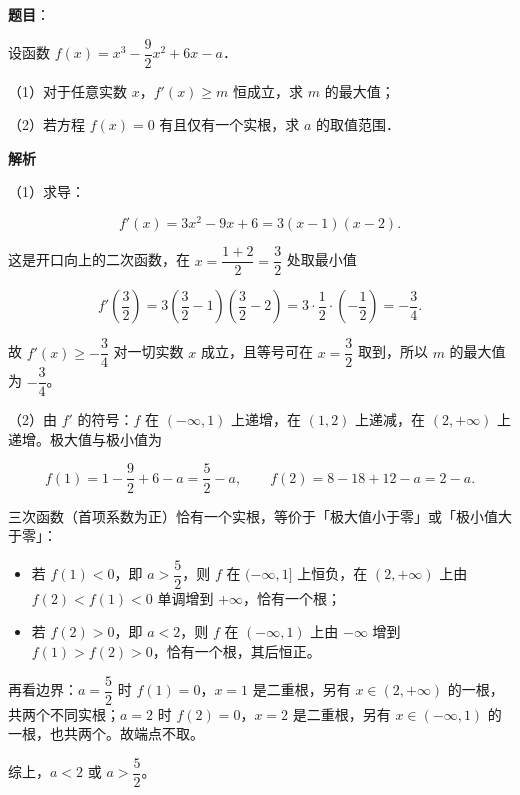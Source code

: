 \begin{answer}

\textbf{题目}：

设函数 $f(x)=x^3-\dfrac92x^2+6x-a$．

（1）对于任意实数 $x$，$f'(x)\geqslant m$ 恒成立，求 $m$ 的最大值；

（2）若方程 $f(x)=0$ 有且仅有一个实根，求 $a$ 的取值范围．

\textbf{解析}

（1）求导：

\nopagebreak[4]
\[f'(x)=3x^2-9x+6=3(x-1)(x-2).\]

这是开口向上的二次函数，在 $x=\dfrac{1+2}{2}=\dfrac32$ 处取最小值

\nopagebreak[4]
\[f'\left(\frac32\right)=3\left(\frac32-1\right)\left(\frac32-2\right)=3\cdot\frac12\cdot\left(-\frac12\right)=-\frac34.\]

故 $f'(x)\geqslant-\dfrac34$ 对一切实数 $x$ 成立，且等号可在 $x=\dfrac32$ 取到，所以 $m$ 的最大值为 $-\dfrac34$。

（2）由 $f'$ 的符号：$f$ 在 $(-\infty,1)$ 上递增，在 $(1,2)$ 上递减，在 $(2,+\infty)$ 上递增。极大值与极小值为

\nopagebreak[4]
\[f(1)=1-\frac92+6-a=\frac52-a,\qquad f(2)=8-18+12-a=2-a.\]

三次函数（首项系数为正）恰有一个实根，等价于「极大值小于零」或「极小值大于零」：

\begin{itemize}
\item 若 $f(1)<0$，即 $a>\dfrac52$，则 $f$ 在 $(-\infty,1]$ 上恒负，在 $(2,+\infty)$ 上由 $f(2)<f(1)<0$ 单调增到 $+\infty$，恰有一个根；
\item 若 $f(2)>0$，即 $a<2$，则 $f$ 在 $(-\infty,1)$ 上由 $-\infty$ 增到 $f(1)>f(2)>0$，恰有一个根，其后恒正。
\end{itemize}

再看边界：$a=\dfrac52$ 时 $f(1)=0$，$x=1$ 是二重根，另有 $x\in(2,+\infty)$ 的一根，共两个不同实根；$a=2$ 时 $f(2)=0$，$x=2$ 是二重根，另有 $x\in(-\infty,1)$ 的一根，也共两个。故端点不取。

综上，$a<2$ 或 $a>\dfrac52$。


\end{answer}
